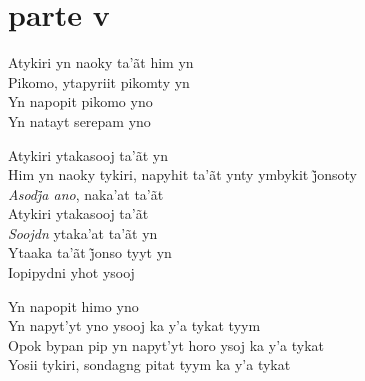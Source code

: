  
\medskip
\section{parte v}

  \noindent Atykiri yn naoky ta'ãt him yn\\
  Pikomo, ytapyriit pikomty yn\\
  Yn napopit pikomo yno\\
  Yn natayt serepam yno
 
 \smallskip
 \begin{center}\end{center}
 \smallskip
 
\noindent   Atykiri ytakasooj ta'ãt yn\\
  Him yn naoky tykiri, napyhit ta’ãt ynty ymbykit j̃onsoty\\
  \textit{Asodj̃a ano}, naka’at ta’ãt\\
  Atykiri ytakasooj ta'ãt\\
  \textit{Soojdn} ytaka'at ta'ãt yn\\
  Ytaaka ta’ãt j̃onso tyyt yn\\
  Iopipydni yhot ysooj
 
 \smallskip
 \begin{center}\end{center}
 \smallskip
 
\noindent   Yn napopit himo yno\\
  Yn napyt'yt yno ysooj ka y'a tykat tyym\\
  Opok bypan pip yn napyt'yt horo ysoj ka y'a tykat\\
  Yosii tykiri, sondagng pitat tyym ka y'a tykat
 
